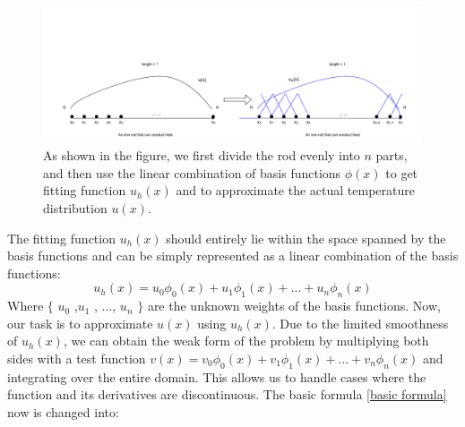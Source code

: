 \documentclass{article}
\begin{document}
    \begin{figure}[H]
        \centering %
        \includegraphics[width=16cm]{pic/1.drawio.pdf} %
        \caption{As shown in the figure, we first divide the rod evenly into $n$ parts, and then use the linear combination of basis functions $\phi(x)$ to get fitting function $u_h(x)$ and to approximate the actual temperature distribution $u(x)$.
} %
        \label{pic_1}
    \end{figure}
    
   The fitting function $u_h(x)$ should entirely lie within the space spanned by the basis functions and can be simply represented as a linear combination of the basis functions:
   \begin{equation}
       u_h(x)=u_{0}\phi_{0}(x)+u_{1}\phi_{1}(x)+...+u_{n}\phi_{n}(x) \label{u(x)}
   \end{equation}
    Where $\{$ $u_0$ ,$u_1$ , ..., $u_n$ $\}$ are the unknown weights of the basis functions. Now, our task is to approximate \( u(x) \) using \( u_h(x) \). Due to the limited smoothness of $u_{h}(x)$, we can obtain the weak form of the problem by multiplying both sides with a test function 
     \( v(x) = v_{0}\phi_{0}(x)+v_{1}\phi_{1}(x)+...+v_{n}\phi_{n}(x) \) and integrating over the entire domain. This allows us to handle cases where the function and its derivatives are discontinuous. The basic formula \ref{basic formula} now is changed into:
\end{document}
